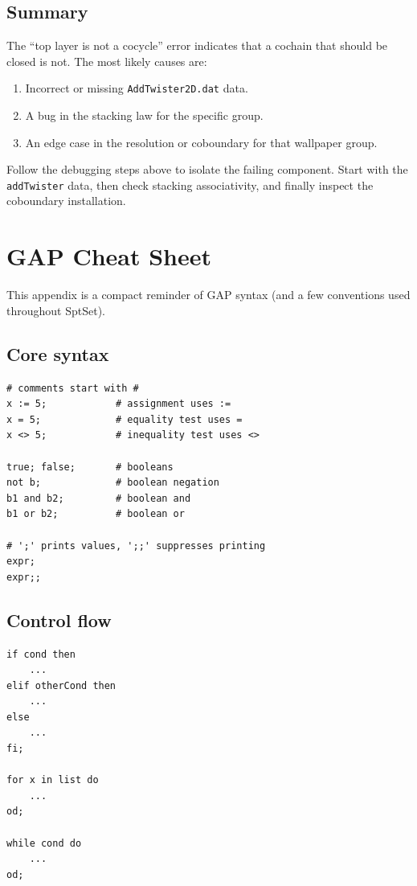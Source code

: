 \documentclass{SciPost}
\begin{document}
\subsection{Summary}

The ``top layer is not a cocycle'' error indicates that a cochain that should be closed is not.
The most likely causes are:
\begin{enumerate}
    \item Incorrect or missing \texttt{AddTwister2D.dat} data.
    \item A bug in the stacking law for the specific group.
    \item An edge case in the resolution or coboundary for that wallpaper group.
\end{enumerate}
Follow the debugging steps above to isolate the failing component.
Start with the \texttt{addTwister} data, then check stacking associativity, and finally inspect the coboundary installation.


\appendix

\section{GAP Cheat Sheet}
\label{app:gap-cheat-sheet}

This appendix is a compact reminder of GAP syntax (and a few conventions used throughout SptSet).

\subsection{Core syntax}

\begin{verbatim}
# comments start with #
x := 5;            # assignment uses :=
x = 5;             # equality test uses =
x <> 5;            # inequality test uses <>

true; false;       # booleans
not b;             # boolean negation
b1 and b2;         # boolean and
b1 or b2;          # boolean or

# ';' prints values, ';;' suppresses printing
expr;
expr;;
\end{verbatim}

\subsection{Control flow}

\begin{verbatim}
if cond then
    ...
elif otherCond then
    ...
else
    ...
fi;

for x in list do
    ...
od;

while cond do
    ...
od;
\end{verbatim}
\end{document}
